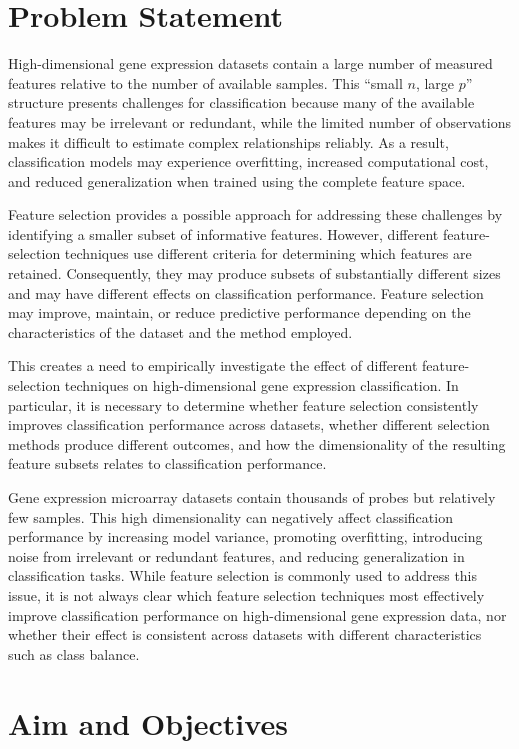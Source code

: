 \section{Problem Statement}

High-dimensional gene expression datasets contain a large number of measured features relative to the number of available samples. This ``small $n$, large $p$'' structure presents challenges for classification because many of the available features may be irrelevant or redundant, while the limited number of observations makes it difficult to estimate complex relationships reliably. As a result, classification models may experience overfitting, increased computational cost, and reduced generalization when trained using the complete feature space.

Feature selection provides a possible approach for addressing these challenges by identifying a smaller subset of informative features. However, different feature-selection techniques use different criteria for determining which features are retained. Consequently, they may produce subsets of substantially different sizes and may have different effects on classification performance. Feature selection may improve, maintain, or reduce predictive performance depending on the characteristics of the dataset and the method employed.

This creates a need to empirically investigate the effect of different feature-selection techniques on high-dimensional gene expression classification. In particular, it is necessary to determine whether feature selection consistently improves classification performance across datasets, whether different selection methods produce different outcomes, and how the dimensionality of the resulting feature subsets relates to classification performance.

Gene expression microarray datasets contain thousands of probes but relatively few samples. This high dimensionality can negatively affect classification performance by increasing model variance, promoting overfitting, introducing noise from irrelevant or redundant features, and reducing generalization in classification tasks. While feature selection is commonly used to address this issue, it is not always clear which feature selection techniques most effectively improve classification performance on high-dimensional gene expression data, nor whether their effect is consistent across datasets with different characteristics such as class balance.


\section{Aim and Objectives}

